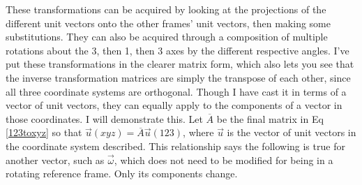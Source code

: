 \documentclass[10pt]{article}
\begin{document}
These transformations can be acquired by looking at the projections of 
the different unit vectors onto the other frames' unit vectors, then 
making some substitutions. They can also be acquired through a composition of 
multiple rotations about the 3, then 1, then 3 axes by the different 
respective angles. I've put these transformations in the clearer matrix form, 
which also lets you see that the inverse transformation matrices are simply the 
transpose of each other, since all three coordinate systems are orthogonal.
Though I have cast it in terms of a vector of unit vectors, they can equally 
apply to the components of a vector in those coordinates. I will 
demonstrate this. Let $\overline{A}$ 
be the final matrix in Eq \ref{123toxyz} so that 
$\vec u(xyz)=\overline{A}\vec u(123)$, where $\vec u$ is the vector of unit
vectors in the coordinate system described. This relationship 
says the following is true for another vector, such as $\vec\omega$, 
which does not need to be modified for being in a rotating reference frame. 
Only its components change.
\end{document}
